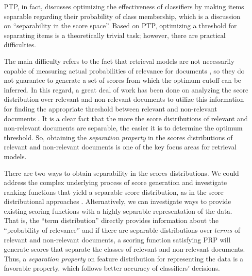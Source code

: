 PTP, in fact, discusses optimizing the effectiveness of classifiers by making items separable regarding their probability of class membership, which is a discussion on ``separability in the score space''. Based on PTP, optimizing a threshold for separating items is a theoretically trivial task; however, there are practical difficulties. 

The main difficulty refers to the fact that retrieval models are not necessarily capable of measuring actual probabilities of relevance for documents \citep{Arampatzis:2001}, so they do not guarantee to generate a set of scores from which the optimum cutoff can be inferred. 
In this regard, a great deal of work has been done on analyzing the score distribution over relevant and non-relevant documents to utilize this information for finding the appropriate threshold between relevant and non-relevant documents \citep{Kanoulas:2009,Arampatzis:2009,Arampatzis:2001}. 
%
It is a clear fact that the more the score distributions of relevant and non-relevant documents are separable, the easier it is to determine the optimum threshold. 
So, obtaining the \emph{separation property} in the scores distributions of relevant and non-relevant documents is one of the key focus areas for retrieval models.

There are two ways to obtain separability in the scores distributions.  We could address the complex underlying process of score generation and investigate ranking functions that yield a separable score distribution, as in the score distributional approaches \citep{Arampatzis:2001}.  Alternatively, we can investigate ways to provide existing scoring functions with a highly separable representation of the data. 
That is, the ``term distribution'' directly provides information about the ``probability of relevance'' \citep{Crestani:1998} and if there are separable distributions over $terms$ of relevant and non-relevant documents, a scoring function satisfying PRP will generate scores that separate the classes of relevant and non-relevant documents. 
Thus, a \emph{separation property} on feature distribution for representing the data is a favorable property, which follows better accuracy of classifiers' decisions.

